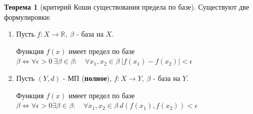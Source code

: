 \documentclass{report}
\theoremstyle{definition}
\newtheorem{theorem}{Теорема}[section]
\begin{document}
\begin{theorem}[критерий Коши существования предела по базе]
  Существуют две формулировки:
  \begin{enumerate}
    \item Пусть $f:X\rightarrow\mathbb{R}, \ \beta$ - база на $X$.

          Функция $f(x)$ имеет предел по базе $\beta \iff \forall \epsilon > 0 \ \exists\beta\in\beta: \quad \forall
            x_{1},x_{2} \in \beta \ |f(x_{1}) - f(x_{2})| < \epsilon$

    \item Пусть $(Y,d)$ - МП (\textbf{полное}), $f:X\rightarrow Y, \ \beta$ - база на $Y$.

          Функция $f(x)$ имеет предел по базе $\beta \iff \forall \epsilon>0\exists\beta\in\beta: \quad \forall
            x_{1},x_{2} \in \beta \ d(f(x_{1}), f(x_{2})) < \epsilon$
  \end{enumerate}
\end{theorem}
\end{document}
